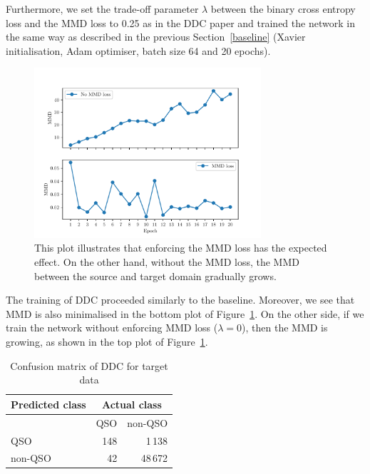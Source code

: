 Furthermore, we set the trade-off parameter \(\lambda\)
between the binary cross entropy loss
and the MMD loss to 0.25 as in the DDC paper
and trained the network in the same way as described in the previous Section~\ref{baseline}
(Xavier initialisation, Adam optimiser, batch size 64 and 20 epochs).

\begin{figure}
\begin{center}
\includegraphics[width=0.75\textwidth]{img/ddc_mmds.pdf}
\end{center}
\caption[Maximum mean discrepancy with and without MMD loss]{
	This plot illustrates that enforcing the MMD loss has the expected effect. On the other hand, without the MMD loss, the MMD between the source and target domain gradually grows.
}
\label{ddc_mmds}
\end{figure}

The training of DDC proceeded similarly to the baseline.
Moreover, we see that MMD is also minimalised in the bottom plot of Figure~\ref{ddc_mmds}.
On the other side, if we train the network without enforcing MMD loss (\(\lambda = 0\)),
then the MMD is growing, as shown in the top plot of Figure~\ref{ddc_mmds}.

\begin{table}
\begin{center}
\begin{tabular}{|l|r|r|}
	\hline
	Predicted class & \multicolumn{2}{c|}{Actual class} \\
	\hline \hline
	& QSO & non-QSO \\ \hline
	QSO & 148 & 1\,138 \\ \hline
	non-QSO & 42 & 48\,672 \\ \hline
\end{tabular}
\end{center}
\caption{Confusion matrix of DDC for target data}
\label{ddc_confusion}
\end{table}

